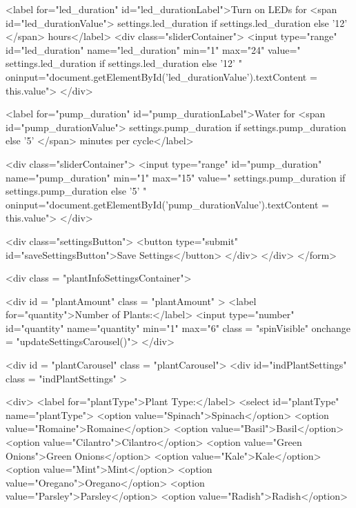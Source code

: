 \documentclass[12pt]{article} %
\begin{document}
\begin{htmlcode}[caption={Settings Page HTML}]
                
                <label for="led_duration" id="led_durationLabel">Turn on LEDs for <span id="led_durationValue">{{ settings.led_duration if settings.led_duration else '12' }}</span> hours</label>
                <div class="sliderContainer">
                    <input type="range" id="led_duration" name="led_duration" min="1" max="24" value="{{ settings.led_duration if settings.led_duration else '12' }}" oninput="document.getElementById('led_durationValue').textContent = this.value">
                </div>
        
                <label for="pump_duration" id="pump_durationLabel">Water for <span id="pump_durationValue">{{ settings.pump_duration if settings.pump_duration else '5' }}</span> minutes per cycle</label>
    
                <div class="sliderContainer">
                    <input type="range" id="pump_duration" name="pump_duration" min="1" max="15" value="{{ settings.pump_duration if settings.pump_duration else '5' }}" oninput="document.getElementById('pump_durationValue').textContent = this.value">
                </div>
        
                <div class="settingsButton">
                    <button type="submit" id="saveSettingsButton">Save Settings</button>
                </div>
            </div>
        </form>
        
        <div class = "plantInfoSettingsContainer">
        
            <div id = "plantAmount" class = "plantAmount" >
                <label for="quantity">Number of Plants:</label>
                <input type="number" id="quantity" name="quantity" min="1" max="6" class = "spinVisible" onchange = "updateSettingsCarousel()">
            </div>
    
            <div id = "plantCarousel" class = "plantCarousel">
                <div id="indPlantSettings" class = "indPlantSettings" >
    
                    <div>
                        <label for="plantType">Plant Type:</label>
                        <select id="plantType" name="plantType">
                                <option value="Spinach">Spinach</option>
                                <option value="Romaine">Romaine</option>
                                <option value="Basil">Basil</option>
                                <option value="Cilantro">Cilantro</option>
                                <option value="Green Onions">Green Onions</option>
                                <option value="Kale">Kale</option>
                                <option value="Mint">Mint</option>
                                <option value="Oregano">Oregano</option>
                                <option value="Parsley">Parsley</option>
                                <option value="Radish">Radish</option>
    

\end{htmlcode}
\end{document}
